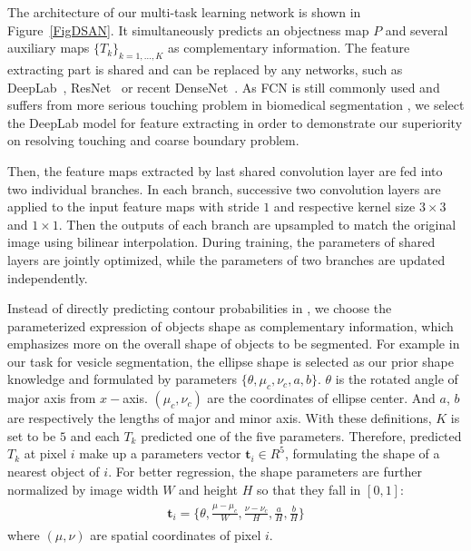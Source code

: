 The architecture of our multi-task learning network is shown in Figure~\ref{FigDSAN}.
It simultaneously predicts an objectness map $P$ and several auxiliary maps $\{T_k\}_{k=1,\ldots,K}$ as complementary information.
The feature extracting part is shared and can be replaced by any networks, such as DeepLab~\cite{Chen2014a}, ResNet~\cite{Zhao2016} or recent DenseNet~\cite{Huang2016}. 
As FCN is still commonly used and suffers from more serious touching problem in biomedical segmentation \cite{Chen2015,Lieman-Sifry2017,Xu2016,Chen2016b}, we select the DeepLab model for feature extracting in order to demonstrate our superiority on resolving touching and coarse boundary problem.

Then, the feature maps extracted by last shared convolution layer are fed into two individual branches.
In each branch, successive two convolution layers are applied to the input feature maps with stride $1$ and respective kernel size $3\times 3$and $1\times 1$.
Then the outputs of each branch are upsampled to match the original image using bilinear interpolation.
During training, the parameters of shared layers are jointly optimized, while the parameters of two branches are updated independently.

Instead of directly predicting contour probabilities in \cite{Chen2016a,Xu2016}, we choose the parameterized expression of objects shape as complementary information, which emphasizes more on the overall shape of objects to be segmented.
For example in our task for vesicle segmentation, the ellipse shape is selected as our prior shape knowledge and formulated by parameters $\{\theta, \mu_c, \nu_c, a, b\}$.
$\theta$ is the rotated angle of major axis from $x-$axis.
$(\mu_c, \nu_c)$ are the coordinates of ellipse center.
And $a$, $b$ are respectively the lengths of major and minor axis.
With these definitions, $K$ is set to be $5$ and each $T_k$ predicted one of the five parameters.
Therefore, predicted $T_k$ at pixel $i$ make up a parameters vector $\mathbf{t}_i\in R^5$, formulating the shape of a nearest object of $i$.
For better regression, the shape parameters are further normalized by image width $W$ and height $H$ so that they fall in $[0,1]$:
\begin{eqnarray}\label{EqPara}
\begin{aligned}
\mathbf{t}_{i} = \{\theta,\frac{\mu-\mu_c}{W},\frac{\nu-\nu_c}{H},\frac{a}{H},\frac{b}{H}\}
\end{aligned}
\end{eqnarray}
where $(\mu, \nu)$ are spatial coordinates of pixel $i$.

